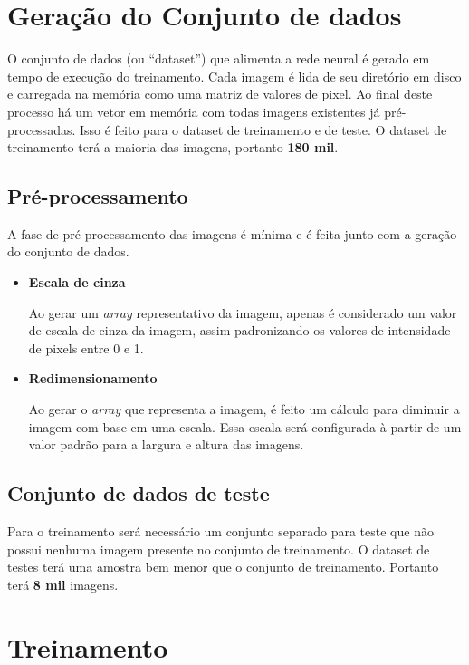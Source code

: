\section{Geração do Conjunto de dados}

O conjunto de dados (ou ``dataset'') que alimenta a rede neural é
gerado em tempo de execução do treinamento. Cada imagem é lida de seu
diretório em disco e carregada na memória como uma matriz de valores
de pixel. Ao final deste processo há um vetor em memória com todas
imagens existentes já pré-processadas. Isso é feito para o dataset de
treinamento e de teste. O dataset de treinamento terá a maioria das
imagens, portanto {\bf 180 mil}.

\subsection{Pré-processamento}

A fase de pré-processamento das imagens é mínima e é feita junto com a
geração do conjunto de dados.

\begin{itemize}
\item{\bf Escala de cinza}

Ao gerar um \textit{array} representativo da imagem, apenas é
considerado um valor de escala de cinza da imagem, assim padronizando
os valores de intensidade de pixels entre 0 e 1.

\item{\bf Redimensionamento}

Ao gerar o \textit{array} que representa a imagem, é feito um cálculo
para diminuir a imagem com base em uma escala. Essa escala será
configurada à partir de um valor padrão para a largura e altura das
imagens. 

\end{itemize}

\subsection{Conjunto de dados de teste}

Para o treinamento será necessário um conjunto separado para teste que
não possui nenhuma imagem presente no conjunto de treinamento.
O dataset de testes terá uma amostra bem menor que o conjunto de
treinamento. Portanto terá {\bf 8 mil} imagens.

\section{Treinamento}

